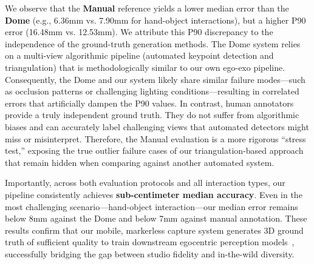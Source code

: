 \documentclass[10pt,twocolumn,letterpaper]{article}
\begin{document}
We observe that the \textbf{Manual} reference yields a lower median error than the \textbf{Dome} (e.g., 6.36mm vs. 7.90mm for hand-object interactions), but a higher P90 error (16.48mm vs. 12.53mm). 
We attribute this P90 discrepancy to the independence of the ground-truth generation methods. The Dome system relies on a multi-view algorithmic pipeline (automated keypoint detection and triangulation) that is methodologically similar to our own ego-exo pipeline. Consequently, the Dome and our system likely share similar failure modes—such as occlusion patterns or challenging lighting conditions—resulting in correlated errors that artificially dampen the P90 values. 
In contrast, human annotators provide a truly independent ground truth. They do not suffer from algorithmic biases and can accurately label challenging views that automated detectors might miss or misinterpret. Therefore, the Manual evaluation is a more rigorous ``stress test,'' exposing the true outlier failure cases of our triangulation-based approach that remain hidden when comparing against another automated system.

Importantly, across both evaluation protocols and all interaction types, our pipeline consistently achieves \textbf{sub-centimeter median accuracy}. Even in the most challenging scenario—hand-object interaction—our median error remains below 8mm against the Dome and below 7mm against manual annotation. 
These results confirm that our mobile, markerless capture system generates 3D ground truth of sufficient quality to train downstream egocentric perception models~\cite{han2020megatrack, han2022umetrack, pavlakos2024reconstructing, zhang2016learning, yang2024mlphand, prakash20243d, fan2023arctic}, successfully bridging the gap between studio fidelity and in-the-wild diversity.
\end{document}
